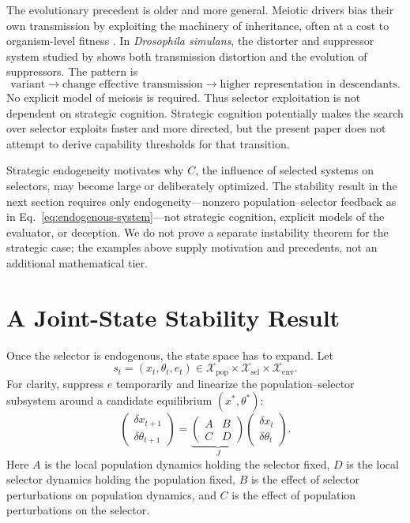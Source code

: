 \documentclass[11pt]{article}
\newcommand{\X}{\mathcal{X}}
\begin{document}
The evolutionary precedent is older and more general. Meiotic drivers bias their own transmission by exploiting the machinery of inheritance, often at a cost to organism-level fitness \parencite{courret2019}. In \emph{Drosophila simulans}, the distorter and suppressor system studied by \textcite{tao2007a,tao2007b} shows both transmission distortion and the evolution of suppressors. The pattern is
\begin{equation}
    \text{variant}
    \longrightarrow
    \text{change effective transmission}
    \longrightarrow
    \text{higher representation in descendants}.
\end{equation}
No explicit model of meiosis is required. Thus selector exploitation is not dependent on strategic cognition. Strategic cognition potentially makes the search over selector exploits faster and more directed, but the present paper does not attempt to derive capability thresholds for that transition.

Strategic endogeneity motivates why $C$, the influence of selected systems on selectors, may become large or deliberately optimized. The stability result in the next section requires only endogeneity---nonzero population--selector feedback as in Eq.~\eqref{eq:endogenous-system}---not strategic cognition, explicit models of the evaluator, or deception. We do not prove a separate instability theorem for the strategic case; the examples above supply motivation and precedents, not an additional mathematical tier.

\section{A Joint-State Stability Result}

Once the selector is endogenous, the state space has to expand. Let
\begin{equation}
    s_t=(x_t,\theta_t,e_t)
    \in
    \X_{\mathrm{pop}}\times\X_{\mathrm{sel}}\times\X_{\mathrm{env}}.
    \label{eq:joint-state}
\end{equation}
For clarity, suppress $e$ temporarily and linearize the population--selector subsystem around a candidate equilibrium $(x^*,\theta^*)$:
\begin{equation}
    \begin{pmatrix}
    \delta x_{t+1}\\
    \delta\theta_{t+1}
    \end{pmatrix}
    =
    \underbrace{
    \begin{pmatrix}
    A & B\\
    C & D
    \end{pmatrix}
    }_{J}
    \begin{pmatrix}
    \delta x_t\\
    \delta\theta_t
    \end{pmatrix}.
    \label{eq:block-jacobian}
\end{equation}
Here $A$ is the local population dynamics holding the selector fixed, $D$ is the local selector dynamics holding the population fixed, $B$ is the effect of selector perturbations on population dynamics, and $C$ is the effect of population perturbations on the selector.
\end{document}
